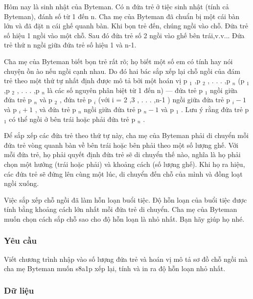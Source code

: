 



   Hôm nay là sinh nhật của Byteman. Có n đứa trẻ ở tiệc sinh nhật (tính cả Byteman), đánh số từ 1 đến n. Cha mẹ của Byteman đã chuẩn bị một cái bàn lớn và đã đặt n cái ghế quanh bàn. Khi bọn trẻ đến, chúng ngồi vào chỗ. Đứa trẻ số hiệu 1 ngồi vào một chỗ. Sau đó đứa trẻ số 2 ngồi vào ghế bên trái,v.v... Đứa trẻ thứ n ngồi giữa đứa trẻ số hiệu 1 và n-1.  

   Cha mẹ của Byteman biết bọn trẻ rất rõ; họ biết một số em có tính hay nói chuyện ồn ào nếu ngồi cạnh nhau. Do đó hai bác sắp xếp lại chỗ ngồi của đám trẻ theo một thứ tự nhất định được mô tả bởi một hoán vị p   $_    1   $   ,p   $_    2   $   , . . . ,p   $_    n   $   (p   $_    1   $   ,p   $_    2   $   , . . . ,p   $_    n   $   là các số nguyên phân biệt từ 1 đến n) — đứa trẻ p   $_    1   $   ngồi giữa đứa trẻ p   $_    n   $   và p   $_    2   $   , đứa trẻ p   $_    i   $   (với i = 2 ,3 , . . . ,n-1 ) ngồi giữa đứa trẻ p   $_    i-1   $   và p   $_    i+1   $   , và đứa trẻ p   $_    n   $   ngồi giữa đứa trẻ p   $_    n-1   $   và p   $_    1   $   . Lưu ý rằng đứa trẻ p   $_    1   $   có thể ngồi ở bên trái hoặc phải đứa trẻ p   $_    n   $   .  

   Để sắp xếp các đứa trẻ theo thứ tự này, cha mẹ của Byteman phải di chuyển mỗi đứa trẻ vòng quanh bàn về bên trái hoặc bên phải theo một số lượng ghế. Với mỗi đứa trẻ, họ phải quyết định đứa trẻ sẽ di chuyển thế nào, nghĩa là họ phải chọn một hướng (trái hoặc phải) và khoảng cách (số lượng ghế). Khi họ ra hiệu, các đứa trẻ sẽ đứng lên cùng một lúc, di chuyển đến chỗ của mình và đồng loạt ngồi xuống.  

   Việc sắp xếp chỗ ngồi đã làm hỗn loạn buổi tiệc. Độ hỗn loạn của buổi tiệc được tính bằng khoảng cách lớn nhất mỗi đứa trẻ di chuyển. Cha mẹ của Byteman muốn chọn cách sắp chỗ sao cho độ hỗn loạn là nhỏ nhất. Bạn hãy giúp họ nhé.  

\subsubsection{   Yêu cầu  }

   Viết chương trình nhập vào số lượng đứa trẻ và hoán vị mô tả sơ đồ chỗ ngồi mà cha mẹ Byteman muốn s8a1p xếp lại, tính và in ra độ hỗn loạn nhỏ nhất.  

\subsubsection{   Dữ liệu  }

